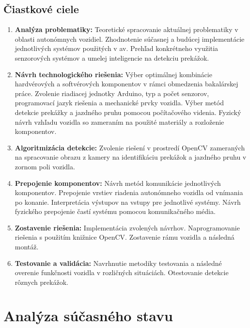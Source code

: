 \subsection{Čiastkové ciele}
\begin{enumerate}
	\item \textbf{Analýza problematiky:} Teoretické spracovanie aktuálnej problematiky v oblasti autonómnych vozidiel. Zhodnotenie súčasnej a budúcej implementácie jednotlivých systémov použitých v \acrshort{av}. Prehľad konkrétneho využitia senzorových systémov a umelej inteligencie na detekciu prekážok.

	\item \textbf{Návrh technologického riešenia:} Výber optimálnej kombinácie hardvérových a softvérových komponentov v rámci obmedzenia bakalárskej práce. Zvolenie riadiacej jednotky Arduino, typ a počet senzorov, programovací jazyk riešenia a mechanické prvky vozidla. Výber metód detekcie prekážky a jazdného pruhu pomocou počítačového videnia. Fyzický návrh vzhľadu vozidla so zameraním na použité materiály a rozloženie komponentov.

	\item \textbf{Algoritmizácia detekcie:} Zvolenie riešení v prostredí OpenCV zameraných na spracovanie obrazu z kamery na identifikáciu prekážok a jazdného pruhu v zornom poli vozidla.

	\item \textbf{Prepojenie komponentov:} Návrh metód komunikácie jednotlivých komponentov. Prepojenie vrstiev riadenia autonómneho vozidla od vnímania po konanie. Interpretácia výstupov na vstupy pre jednotlivé systémy. Návrh fyzického prepojenie častí systému pomocou komunikačného média.

	\item \textbf{Zostavenie riešenia:} Implementácia zvolených návrhov. Naprogramovanie riešenia s použitím knižnice OpenCV. Zostavenie rámu vozidla a následná montáž.

	\item \textbf{Testovanie a validácia:} Navrhnutie metodiky testovania a následné overenie funkčnosti vozidla v rozličných situáciách. Otestovanie detekcie rôznych prekážok.
\end{enumerate}

\section{Analýza súčasného stavu}\label{sec:Analyza}

